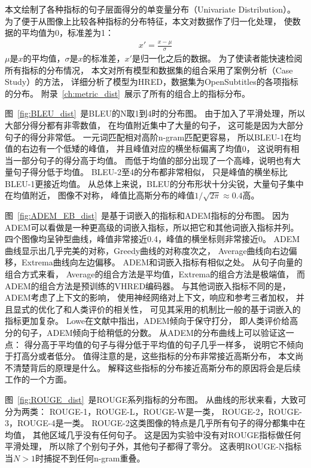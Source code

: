 本文绘制了各种指标的句子层面得分的单变量分布（Univariate Distribution）。 为了便于从图像上比较各种指标的分布特征，本文对数据作了归一化处理， 使数据的平均值为0，标准差为1：
\begin{align}
    x' = \frac{x - \mu}{\sigma}
\end{align}
$\mu$是$x$的平均值，$\sigma$是$x$的标准差，$x'$是归一化之后的数据。 为了使读者能快速检阅所有指标的分布情况， 本文对所有模型和数据集的组合采用了案例分析（Case Study）的方法， 详细分析了模型为HRED，数据集为OpenSubtitles的各项指标的分布。 附录~\ref{ch:metric_dist}~展示了所有的组合上的指标分布。


图~\ref{fig:BLEU_dist}~是BLEU的N取1到4时的分布图。
由于加入了平滑处理，所以大部分得分都有非零数值，
在均值附近集中了大量的句子，
这可能是因为大部分句子的得分非常低。
一元词匹配相对高阶n-gram匹配更容易，
所以BLEU-1在均值的右边有一个低矮的峰值，
并且峰值对应的横坐标偏离了均值0，
这说明有相当一部分句子的得分高于均值。
而低于均值的部分出现了一个高峰，说明也有大量句子得分低于均值。
BLEU-2至4的分布都非常相似，
只是峰值的横坐标比BLEU-1更接近均值。
从总体上来说，BLEU的分布形状十分尖锐，大量句子集中在均值附近，
图像不对称， 峰值比高斯分布的峰值$1 / \sqrt{2 \pi} \approx 0.4$高。


图~\ref{fig:ADEM_EB_dist}~是基于词嵌入的指标和ADEM指标的分布图。 因为ADEM可以看做是一种更高级的词嵌入指标，所以把它和其他词嵌入指标并列。 四个图像均呈钟型曲线，峰值非常接近0.4，峰值的横坐标则非常接近0。 ADEM曲线显示出几乎完美的对称，Greedy曲线的对称度次之， Average曲线向右边偏移，Extrema曲线向左边偏移。 ADEM和词嵌入指标有相似之处。 从句子向量的组合方式来看， Average的组合方法是平均值，Extrema的组合方法是极端值， 而ADEM的组合方法是预训练的VHRED编码器。 与其他词嵌入指标不同的是，ADEM考虑了上下文的影响， 使用神经网络对上下文，响应和参考三者加权， 并且显式的优化了和人类评价的相关性， 可见其采用的机制比一般的基于词嵌入的指标更加复杂。 Lowe在文献\cite{ADEM}中指出，ADEM倾向于保守打分， 即人类评价给高分的句子，ADEM倾向于给稍低的分数。 从ADEM的分布曲线上可以验证这一点： 得分高于平均值的句子与得分低于平均值的句子几乎一样多， 说明它不倾向于打高分或者低分。 值得注意的是，这些指标的分布非常接近高斯分布， 本文尚不清楚背后的原理是什么。 解释这些指标的分布接近高斯分布的原因将会是后续工作的一个方面。


图~\ref{fig:ROUGE_dist}~是ROUGE系列指标的分布图。 从曲线的形状来看，大致可分为两类： ROUGE-1，ROUGE-L，ROUGE-W是一类， ROUGE-2，ROUGE-3，ROUGE-4是一类。 ROUGE-2这类图像的特点是几乎所有句子的得分都集中在均值， 其他区域几乎没有任何句子。 这是因为实验中没有对ROUGE指标做任何平滑处理， 所以除了个别句子外，其他句子都得了零分。 这表明ROUGE-N指标当$N > 1$时捕捉不到任何n-gram重叠。

